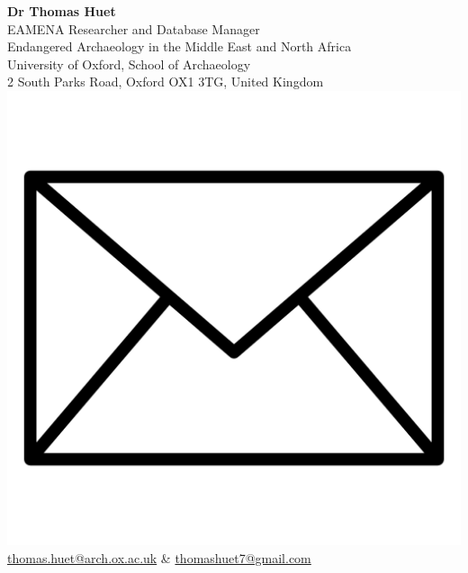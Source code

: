 \documentclass{article}
\begin{document}
\large{\textbf{Dr Thomas Huet}}\\
\normalsize
EAMENA Researcher and Database Manager\\
\small
Endangered Archaeology in the Middle East and North Africa\\
\normalsize
University of Oxford, School of Archaeology\\
\small
2 South Parks Road, Oxford OX1 3TG, United Kingdom
\normalsize
\\
\includegraphics[scale=0.025]{gmail} \quad \href{mailto:thomas.huet@arch.ox.ac.uk}{thomas.huet@arch.ox.ac.uk} \& \href{mailto:thomashuet7@gmail.com}{thomashuet7@gmail.com}\\
\end{document}

